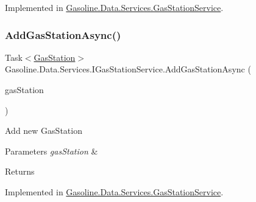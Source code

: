 Implemented in \mbox{\hyperlink{class_gasoline_1_1_data_1_1_services_1_1_gas_station_service_ab9690eb56ba3a4a9c02d3ab8424990b0}{Gasoline.\+Data.\+Services.\+Gas\+Station\+Service}}.

\mbox{\label{interface_gasoline_1_1_data_1_1_services_1_1_i_gas_station_service_ae0bb2d899701dddd473667980e7533d2}} 
\subsubsection{\texorpdfstring{AddGasStationAsync()}{AddGasStationAsync()}}
{\footnotesize\ttfamily Task$<$\mbox{\hyperlink{class_gasoline_1_1_data_1_1_models_1_1_gas_station}{Gas\+Station}}$>$ Gasoline.\+Data.\+Services.\+I\+Gas\+Station\+Service.\+Add\+Gas\+Station\+Async (\begin{DoxyParamCaption}\item[{\mbox{\hyperlink{class_gasoline_1_1_data_1_1_models_1_1_gas_station}{Gas\+Station}}}]{gas\+Station }\end{DoxyParamCaption})}



Add new Gas\+Station 


\begin{DoxyParams}{Parameters}
{\em gas\+Station} & \\
\hline
\end{DoxyParams}
\begin{DoxyReturn}{Returns}

\end{DoxyReturn}


Implemented in \mbox{\hyperlink{class_gasoline_1_1_data_1_1_services_1_1_gas_station_service_a54922c75e2b138c45dc94dbf0c0c5b29}{Gasoline.\+Data.\+Services.\+Gas\+Station\+Service}}.

\mbox{\label{interface_gasoline_1_1_data_1_1_services_1_1_i_gas_station_service_a22a21285a89cfffb01dfe3bedffa63f5}} 
